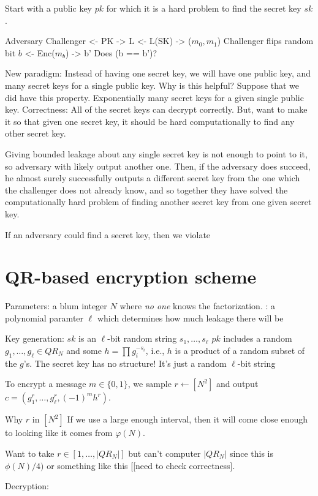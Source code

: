 \documentclass[10pt]{article}
\newcommand{\bit}{\{0,1\}}
\begin{document}
Start with a public key $pk$ for which it is a hard problem to find the secret key $sk$.

Adversary            Challenger
<- PK
-> L
<- L(SK)
-> ($m_0, m_1$)
Challenger flips random bit $b$
<- Enc($m_b$)
-> b'
Does (b == b')?

New paradigm: Instead of having one secret key, we will have one public key, and many secret keys for a single public key. Why is this helpful? Suppose that we did have this property. Exponentially many secret keys for a given single public key. Correctness: All of the secret keys can decrypt correctly. But, want to make it so that given one secret key, it should be hard computationally to find any other secret key.

Giving bounded leakage about any single secret key is not enough to point to it, so adversary with likely output another one. Then, if the adversary does succeed, he almost surely successfully outputs a different secret key from the one which the challenger does not already know, and so together they have solved the computationally hard problem of finding another secret key from one given secret key.

If an adversary could find a secret key, then we violate

\section{QR-based encryption scheme}

Parameters: a blum integer $N$ where \emph{no one} knows the factorization.
: a polynomial paramter $\ell$ which determines how much leakage there will be

Key generation:
$sk$ is an $\ell$-bit random string $s_1, \ldots, s_\ell$
$pk$ includes a random $g_1, \ldots, g_\ell \in QR_N$ and some $h = \prod g_i^{-s_i}$, i.e., $h$ is a product of a random subset of the $g$'s. The secret key has no structure! It's just a random $\ell$-bit string

To encrypt a message $m \in \bit$, we sample $r \leftarrow [N^2]$ and output $c = (g_1^r, \ldots, g_\ell^r, (-1)^mh^r)$.

Why $r$ in $[N^2]$ If we use a large enough interval, then it will come close enough to looking like it comes from $\varphi(N)$. 

Want to take $r \in [1, \ldots, |QR_N|]$ but can't computer $|QR_N|$ since this is $\phi(N)/4)$ or something like this [[need to check correctness].

Decryption:
\end{document}
